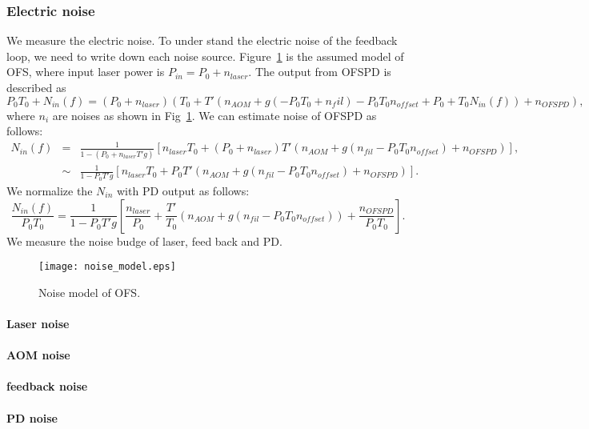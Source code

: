 \subsubsection{Electric noise}
We measure the electric noise. To under stand the electric noise of the feedback loop, we need to write down each noise source.
Figure~\ref{fig:noise} is the assumed model of OFS, where input laser power is $P_{in}=P_0 + n_{laser}$.
The output from OFSPD is described as
\begin{equation}
P_0 T_0 +N_{in}(f) = (P_0 +n_{laser})(T_0+T'(n_{AOM}+g(-P_0 T_0+n_fil)-P_0 T_0 n_{offset} +P_0 +T_0 N_{in}(f))+n_{OFSPD}),
\end{equation}
where $n_{i}$ are noises as shown in Fig~\ref{fig:noise}. We can estimate noise of OFSPD as follows:
\begin{eqnarray}
N_{in}(f)&=&\frac{1}{1-(P_0+n_{laser}T'g)}[n_{laser}T_0 + (P_0+n_{laser})T'(n_{AOM}+g(n_{fil}-P_0T_0n_{offset})+n_{OFSPD})], \nonumber \\
&\sim&\frac{1}{1-P_0T'g}[n_{laser}T_0 + P_0T'(n_{AOM}+g(n_{fil}-P_0T_0n_{offset})+n_{OFSPD})].
\end{eqnarray}
We normalize the $N_{in}$ with PD output as follows:
\begin{equation}
\frac{N_{in}(f)}{P_0T_0}=\frac{1}{1-P_0T'g}[\frac{n_{laser}}{P_0} + \frac{T'}{T_0}(n_{AOM}+g(n_{fil}-P_0T_0n_{offset}))+\frac{n_{OFSPD}}{P_0T_0}].
\end{equation}
 We measure the noise budge of laser, feed back and PD.
\begin{figure}
\begin{center}
\texttt{[image: noise\_model.eps]}
\caption{Noise model of OFS.} 
\label{fig:noise} 
\end{center}
\end{figure}

\paragraph{Laser noise}
\paragraph{AOM noise}
\paragraph{feedback noise}
\paragraph{PD noise}


